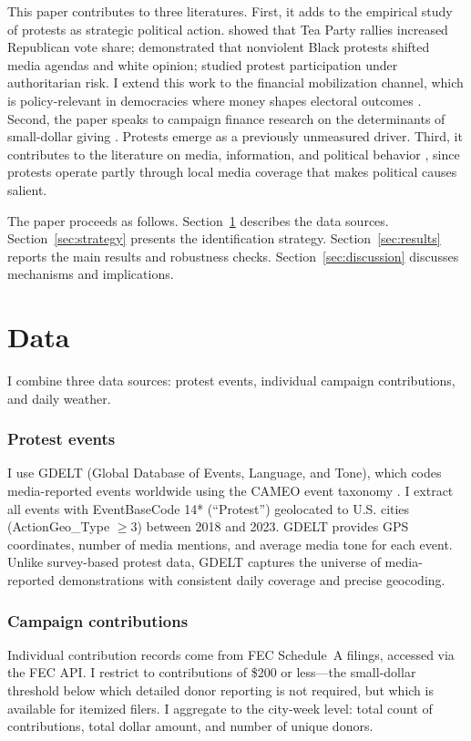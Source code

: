\documentclass[12pt]{article}
\begin{document}
This paper contributes to three literatures. First, it adds to the empirical study of protests as strategic political action. \citet{madestam2013} showed that Tea Party rallies increased Republican vote share; \citet{wasow2020} demonstrated that nonviolent Black protests shifted media agendas and white opinion; \citet{cantoni2019} studied protest participation under authoritarian risk. I extend this work to the financial mobilization channel, which is policy-relevant in democracies where money shapes electoral outcomes \citep{gerber2004}. Second, the paper speaks to campaign finance research on the determinants of small-dollar giving \citep{bonica2014, barber2017}. Protests emerge as a previously unmeasured driver. Third, it contributes to the literature on media, information, and political behavior \citep{dellavigna2007, enikolopov2011, yanagizawa2014}, since protests operate partly through local media coverage that makes political causes salient.

The paper proceeds as follows. Section~\ref{sec:data} describes the data sources. Section~\ref{sec:strategy} presents the identification strategy. Section~\ref{sec:results} reports the main results and robustness checks. Section~\ref{sec:discussion} discusses mechanisms and implications.


\section{Data}
\label{sec:data}

I combine three data sources: protest events, individual campaign contributions, and daily weather.

\subsubsection*{Protest events} I use GDELT (Global Database of Events, Language, and Tone), which codes media-reported events worldwide using the CAMEO event taxonomy \citep{gdelt2013}. I extract all events with EventBaseCode 14* (``Protest'') geolocated to U.S. cities (ActionGeo\_Type $\geq 3$) between 2018 and 2023. GDELT provides GPS coordinates, number of media mentions, and average media tone for each event. Unlike survey-based protest data, GDELT captures the universe of media-reported demonstrations with consistent daily coverage and precise geocoding.

\subsubsection*{Campaign contributions} Individual contribution records come from FEC Schedule~A filings, accessed via the FEC API. I restrict to contributions of \$200 or less---the small-dollar threshold below which detailed donor reporting is not required, but which is available for itemized filers. I aggregate to the city-week level: total count of contributions, total dollar amount, and number of unique donors.
\end{document}
